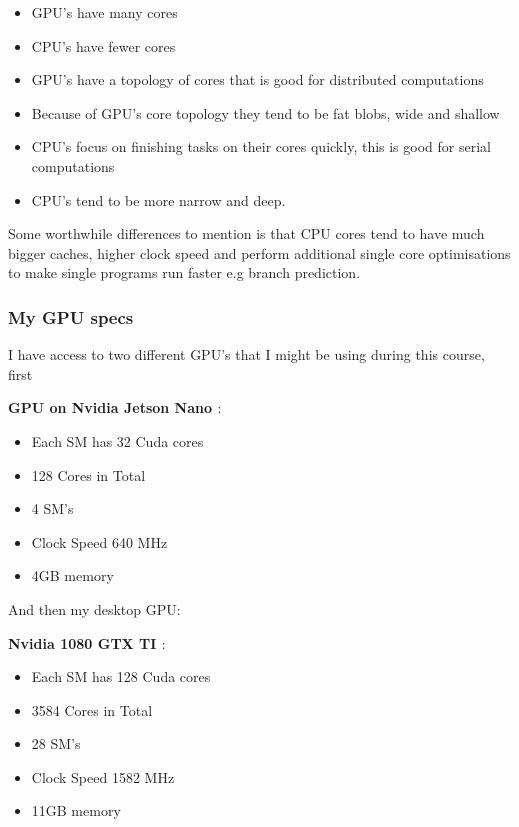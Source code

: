\documentclass{article}
\begin{document}
\begin{itemize}
  \item GPU's have many cores 
  \item CPU's have fewer cores
  \item GPU's have a topology of cores that is good for distributed computations 
  \item Because of GPU's core topology they tend to be fat blobs, wide and shallow
  \item CPU's focus on finishing tasks on their cores quickly, this is good for serial computations 
  \item CPU's tend to be more narrow and deep.
\end{itemize}

Some worthwhile differences to mention is that CPU cores tend to have much bigger caches, higher clock speed and perform additional single core optimisations to
make single programs run faster e.g branch prediction. 

\subsubsection*{My GPU specs}%
\label{ssub:my_gpu_specs}

I have access to two different GPU's that I might be using during this course, first


\textbf{GPU on Nvidia Jetson Nano \cite{Jetson-Nano}}: 

\begin{itemize}
  \item Each SM has 32 Cuda cores
  \item 128 Cores in Total
  \item 4 SM's
  \item Clock Speed 640 MHz
  \item 4GB memory
\end{itemize}

And then my desktop GPU:

\textbf{Nvidia 1080 GTX TI \cite{1080ti}}: 

\begin{itemize}
  \item Each SM has 128 Cuda cores
  \item 3584 Cores in Total
  \item 28 SM's
  \item Clock Speed 1582 MHz
  \item 11GB memory
\end{itemize}
\end{document}
